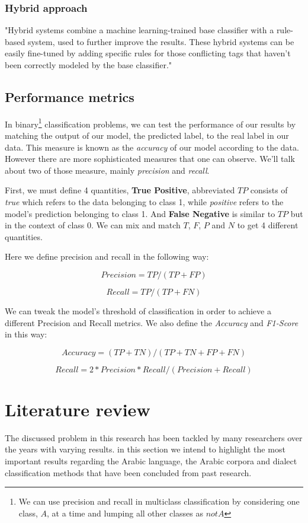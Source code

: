 \documentclass[12pt]{diazessay}
\begin{document}
        
        \subsubsection{Hybrid approach}
        "Hybrid systems combine a machine learning-trained base classifier with a rule-based system, used to further improve the results. These hybrid systems can be easily fine-tuned by adding specific rules for those conflicting tags that haven’t been correctly modeled by the base classifier."\cite{monkey_learn_NLP}
        
        
    \subsection{Performance metrics}
    In binary\footnote{We can use precision and recall in multiclass classification by considering one class, \(A\), at a time and lumping all other classes as \(not A\)} classification problems, we can test the performance of our results by matching the output of our model, the predicted label, to the real label in our data. This measure is known as the \emph{accuracy} of our model according to the data. However there are more sophisticated measures that one can observe. We'll talk about two of those measure, mainly \emph{precision} and \emph{recall}.
    
    First, we must define 4 quantities, \textbf{True Positive}, abbreviated \(TP\) consists of \emph{true} which refers to the data belonging to class 1, while \emph{positive} refers to the model's prediction belonging to class 1. And \textbf{False Negative} is similar to \(TP\) but in the context of class 0. We can mix and match \(T\), \(F\), \(P\) and \(N\) to get 4 different quantities.
    
    Here we define precision and recall in the following way:
    
    \[Precision = TP / (TP + FP)\]
    
    \[Recall = TP / (TP + FN)\]
    
    We can tweak the model's threshold of classification in order to achieve a different Precision and Recall metrics. We also define the \emph{Accuracy} and \emph{F1-Score} in this way:
    
    \[Accuracy = (TP+TN) / (TP + TN + FP + FN)\]
    
    \[Recall = 2 * Precision * Recall / (Precision + Recall)\]


\section{Literature review}
The discussed problem in this research has been tackled by many researchers over the years with varying results. in this section we intend to highlight the most important results regarding the Arabic language, the Arabic corpora and dialect classification methods that have been concluded from past research.
    
\end{document}
